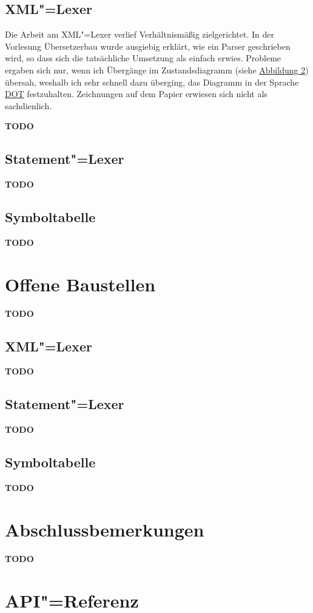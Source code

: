 \documentclass[10pt,a4paper,ngerman,titlepage,tocindentauto]{scrartcl}
\newcommand{\TODO}{ {\LARGE\bf\color{crimson} TODO} }
\begin{document}
		\subsection{XML"=Lexer}
			Die Arbeit am XML"=Lexer verlief Verhältnismäßig zielgerichtet. In der Vorlesung
			Übersetzerbau wurde ausgiebig erklärt, wie ein Parser geschrieben wird, so dass
			sich die tatsächliche Umsetzung als einfach erwies. Probleme ergaben sich nur,
			wenn ich Übergänge im Zustandsdiagramm (siehe \hyperlink{Uebergangsdiagramm_XML_Lexer}{Abbildung 2})
			übersah, weshalb ich sehr schnell dazu überging, das Diagramm in der Sprache
			\href{http://www.graphviz.org/doc/info/lang.html}{DOT} festzuhalten. Zeichnungen auf
			dem Papier erwiesen sich nicht als sachdienlich.
			
			\TODO
	
		\subsection{Statement"=Lexer}
			\TODO
	
		\subsection{Symboltabelle}
			\TODO
	
	\section{Offene Baustellen}
		\TODO
	
		\subsection{XML"=Lexer}
			\TODO
	
		\subsection{Statement"=Lexer}
			\TODO
	
		\subsection{Symboltabelle}
			\TODO
	
	\section[Abschlussbemerkungen]{\hypertarget{Abschlussbemerkungen}{Abschlussbemerkungen}}
		\TODO
		
	\section{API"=Referenz}
\end{document}
